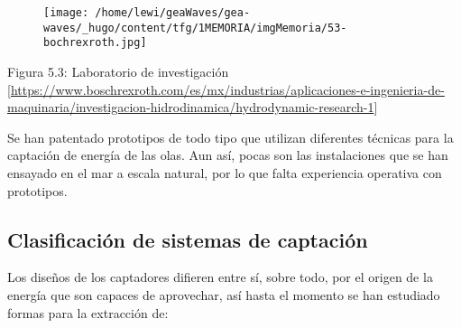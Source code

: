 \begin{figure}
\centering
\texttt{[image: /home/lewi/geaWaves/gea-waves/\_hugo/content/tfg/1MEMORIA/imgMemoria/53-bochrexroth.jpg]}
\caption{}
\end{figure}

Figura 5.3: Laboratorio de investigación
{[}\url{https://www.boschrexroth.com/es/mx/industrias/aplicaciones-e-ingenieria-de-maquinaria/investigacion-hidrodinamica/hydrodynamic-research-1}{]}

Se han patentado prototipos de todo tipo que utilizan diferentes
técnicas para la captación de energía de las olas. Aun así, pocas son
las instalaciones que se han ensayado en el mar a escala natural, por lo
que falta experiencia operativa con prototipos.

\subsection{Clasificación de sistemas de captación}\label{header-n44}

Los diseños de los captadores difieren entre sí, sobre todo, por el
origen de la energía que son capaces de aprovechar, así hasta el momento
se han estudiado formas para la extracción de:

